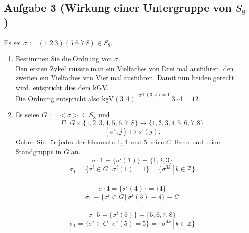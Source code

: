 \documentclass[11pt,a4paper,ngerman]{article}
\newcommand{\Z}{\mathbb{Z}}
\newcommand{\ggT}{\text{ggT}}
\newcommand{\kgV}{\text{kgV}}
\begin{document}
\subsection*{Aufgabe 3 \mdseries (Wirkung einer Untergruppe von $S_8$)}
Es sei $\sigma := (1\;2\;3) (5\;6\;7\;8) \in S_8$.
\begin{enumerate}[\bfseries a)]
\item Bestimmen Sie die Ordnung von $\sigma$. \\
Den ersten Zykel müsste man ein Vielfaches von Drei mal ausführen, den zweiten ein Vielfaches von Vier mal ausführen. Damit nun  beiden gerecht wird, entspricht dies dem kGV. \\
Die Ordnung entspricht also $\kgV(3,4) \stackrel{\ggT(3,4)=1}{=} 3 \cdot 4 = 12$. 
\item Es seien $G := <\sigma> \subseteq S_8$ und
$$ \Gamma:\; G \times \{1,2,3,4,5,6,7,8\} \to \{1,2,3,4,5,6,7,8\} $$
$$(\sigma^i, j) \mapsto s^i(j).$$
Geben Sie für jedes der Elemente 1, 4 und 5 seine $G$-Bahn und seine Standgruppe in $G$ an. \\
$$ \sigma \cdot 1 = \{\sigma^i(1)\} =  \{1,2,3 \}$$
$$ \sigma_1 = \{\sigma^i \in G \, | \, \sigma^i(1) = 1 \} = \{ \sigma^{3k}\,|\,k \in \Z\}$$
\\
$$ \sigma \cdot 4 = \{\sigma^i(4)\} =  \{4\} $$
$$ \sigma_1 = \{\sigma^i \in G \, | \, \sigma^i(3) = 4 \} = G $$
\\
$$ \sigma \cdot 5 = \{\sigma^i(5)\} =  \{5,6,7,8 \} $$
$$ \sigma_1 = \{\sigma^i \in G \, | \, \sigma^i(5) = 5 \} = \{ \sigma^{4k}\,|\,k \in \Z\} $$
\end{enumerate}

\end{document}
